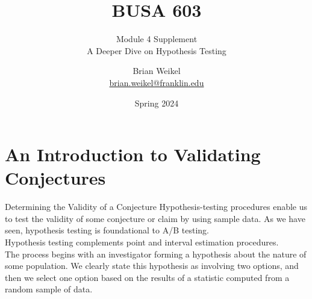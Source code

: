 \documentclass[pdf]{beamer}
\title{BUSA 603}
\subtitle{Module 4 Supplement \\ A Deeper Dive on Hypothesis Testing}
\theoremstyle{remark}
\theoremstyle{definition}
\begin{document}
\author[B. Weikel, Franklin University]{
	\begin{tabular}{c} 
	\Large
	Brian Weikel\\
    \footnotesize \href{mailto:brian.weikel@franklin.edu}{brian.weikel@franklin.edu}
    \vspace{1ex}
\end{tabular}
\vspace{-4ex}}


\date{Spring 2024}%

\begin{noheadline}
\begin{frame}[t]\maketitle\end{frame}
\end{noheadline}

\section{An Introduction to Validating Conjectures}

\begin{frame}[t]{Determining the Validity of a Conjecture}
Hypothesis-testing procedures enable us to test the validity of some conjecture or claim by using sample data.  As we have seen, hypothesis testing is foundational to A/B testing.  \\
\vspace{1.5ex}
Hypothesis testing complements point and interval estimation procedures. \\
\vspace{1.5ex}
The process begins with an investigator forming a hypothesis about the nature of some population. We clearly state this hypothesis  as involving two options, and then we select one option based on the results of a statistic computed from a random sample of data.
\end{frame}
\end{document}
